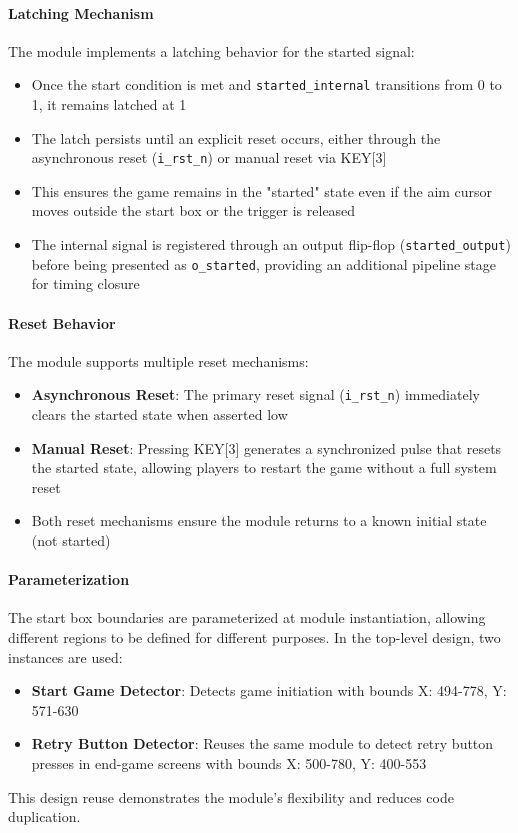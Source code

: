 \documentclass[12pt,a4paper]{article}
\begin{document}
\paragraph{Latching Mechanism}
The module implements a latching behavior for the started signal:
\begin{itemize}
    \item Once the start condition is met and \texttt{started\_internal} transitions from 0 to 1, it remains latched at 1
    \item The latch persists until an explicit reset occurs, either through the asynchronous reset (\texttt{i\_rst\_n}) or manual reset via KEY[3]
    \item This ensures the game remains in the "started" state even if the aim cursor moves outside the start box or the trigger is released
    \item The internal signal is registered through an output flip-flop (\texttt{started\_output}) before being presented as \texttt{o\_started}, providing an additional pipeline stage for timing closure
\end{itemize}

\paragraph{Reset Behavior}
The module supports multiple reset mechanisms:
\begin{itemize}
    \item \textbf{Asynchronous Reset}: The primary reset signal (\texttt{i\_rst\_n}) immediately clears the started state when asserted low
    \item \textbf{Manual Reset}: Pressing KEY[3] generates a synchronized pulse that resets the started state, allowing players to restart the game without a full system reset
    \item Both reset mechanisms ensure the module returns to a known initial state (not started)
\end{itemize}

\paragraph{Parameterization}
The start box boundaries are parameterized at module instantiation, allowing different regions to be defined for different purposes. In the top-level design, two instances are used:
\begin{itemize}
    \item \textbf{Start Game Detector}: Detects game initiation with bounds X: 494-778, Y: 571-630
    \item \textbf{Retry Button Detector}: Reuses the same module to detect retry button presses in end-game screens with bounds X: 500-780, Y: 400-553
\end{itemize}
This design reuse demonstrates the module's flexibility and reduces code duplication.
\end{document}
